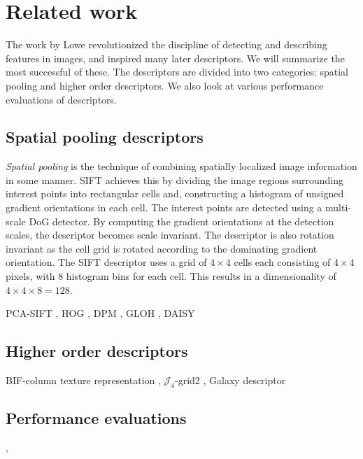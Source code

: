 \documentclass[../thesis.tex]{subfiles}
\begin{document}
\section{Related work}

The work by Lowe \cite{lowe2004distinctive} revolutionized the discipline of detecting and describing features in images, and inspired many later descriptors. We will summarize the most successful of these. The descriptors are divided into two categories: spatial pooling and higher order descriptors. We also look at various performance evaluations of descriptors.

\subsection{Spatial pooling descriptors}

\emph{Spatial pooling} is the technique of combining spatially localized image information in some manner. SIFT \cite{lowe2004distinctive} achieves this by dividing the image regions surrounding interest points into rectangular cells and, constructing a histogram of unsigned gradient orientations in each cell. The interest points are detected using a multi-scale DoG detector. By computing the gradient orientations at the detection scales, the descriptor becomes scale invariant. The descriptor is also rotation invariant as the cell grid is rotated according to the dominating gradient orientation. The SIFT descriptor uses a grid of $4 \times 4$ cells each consisting of $4 \times 4$ pixels, with 8 histogram bins for each cell. This results in a dimensionality of $4 \times 4 \times 8 = 128$.

PCA-SIFT \cite{ke2004pca},
HOG \cite{dalal2005histograms},
DPM \cite{felzenszwalb2008discriminatively},
GLOH \cite{mikolajczyk2005performance},
DAISY \cite{tola2008fast,winder2009picking}

\subsection{Higher order descriptors}

BIF-column texture representation \cite{crosier2010using},
$\mathcal{J}_4$-grid2 \cite{larsen2012jet},
Galaxy descriptor \cite{pedersen2013shape}

\subsection{Performance evaluations}

\cite{mikolajczyk2005performance},
\cite{dahl2011finding}

\subbibliography
\end{document}

